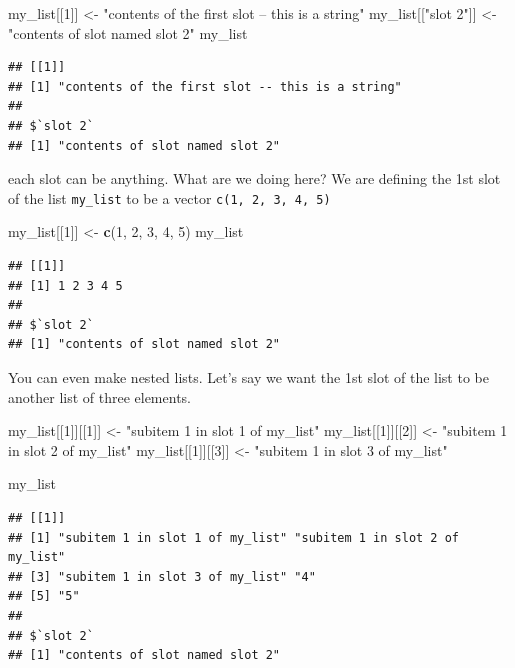 \documentclass[]{book}
\newenvironment{Shaded}{\begin{snugshade}}{\end{snugshade}}
\newcommand{\DecValTok}[1]{\textcolor[rgb]{0.00,0.00,0.81}{#1}}
\newcommand{\KeywordTok}[1]{\textcolor[rgb]{0.13,0.29,0.53}{\textbf{#1}}}
\newcommand{\NormalTok}[1]{#1}
\newcommand{\StringTok}[1]{\textcolor[rgb]{0.31,0.60,0.02}{#1}}
\theoremstyle{definition}
\theoremstyle{definition}
\theoremstyle{definition}
\theoremstyle{remark}
\begin{document}
\begin{Shaded}
\begin{Highlighting}[]
\begin{Shaded}
\begin{Highlighting}[]
\begin{Shaded}
\begin{Highlighting}[]
\begin{Shaded}
\begin{Highlighting}[]
\NormalTok{my_list[[}\DecValTok{1}\NormalTok{]] <-}\StringTok{ "contents of the first slot -- this is a string"}
\NormalTok{my_list[[}\StringTok{"slot 2"}\NormalTok{]] <-}\StringTok{ "contents of slot named slot 2"}
\NormalTok{my_list}
\end{Highlighting}
\end{Shaded}

\begin{verbatim}
## [[1]]
## [1] "contents of the first slot -- this is a string"
## 
## $`slot 2`
## [1] "contents of slot named slot 2"
\end{verbatim}

each slot can be anything. What are we doing here? We are defining the 1st slot of the list \texttt{my\_list} to be a vector \texttt{c(1,\ 2,\ 3,\ 4,\ 5)}

\begin{Shaded}
\begin{Highlighting}[]
\NormalTok{my_list[[}\DecValTok{1}\NormalTok{]] <-}\StringTok{ }\KeywordTok{c}\NormalTok{(}\DecValTok{1}\NormalTok{, }\DecValTok{2}\NormalTok{, }\DecValTok{3}\NormalTok{, }\DecValTok{4}\NormalTok{, }\DecValTok{5}\NormalTok{)}
\NormalTok{my_list}
\end{Highlighting}
\end{Shaded}

\begin{verbatim}
## [[1]]
## [1] 1 2 3 4 5
## 
## $`slot 2`
## [1] "contents of slot named slot 2"
\end{verbatim}

You can even make nested lists. Let's say we want the 1st slot of the list to be another list of three elements.

\begin{Shaded}
\begin{Highlighting}[]
\NormalTok{my_list[[}\DecValTok{1}\NormalTok{]][[}\DecValTok{1}\NormalTok{]] <-}\StringTok{ "subitem 1 in slot 1 of my_list"}
\NormalTok{my_list[[}\DecValTok{1}\NormalTok{]][[}\DecValTok{2}\NormalTok{]] <-}\StringTok{ "subitem 1 in slot 2 of my_list"}
\NormalTok{my_list[[}\DecValTok{1}\NormalTok{]][[}\DecValTok{3}\NormalTok{]] <-}\StringTok{ "subitem 1 in slot 3 of my_list"}

\NormalTok{my_list}
\end{Highlighting}
\end{Shaded}

\begin{verbatim}
## [[1]]
## [1] "subitem 1 in slot 1 of my_list" "subitem 1 in slot 2 of my_list"
## [3] "subitem 1 in slot 3 of my_list" "4"                             
## [5] "5"                             
## 
## $`slot 2`
## [1] "contents of slot named slot 2"
\end{verbatim}


\end{Highlighting}
\end{Shaded}
\end{Highlighting}
\end{Shaded}
\end{Highlighting}
\end{Shaded}
\end{document}
